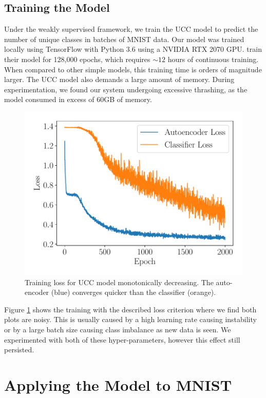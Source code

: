 \documentclass{article} %
\begin{document}
\subsection{Training the Model} %
Under the weakly supervised framework, we train the UCC model to predict the number of unique classes in batches of MNIST data. Our model was trained locally using TensorFlow with Python 3.6 using a NVIDIA RTX 2070 GPU. \cite{Oner2019} train their model for 128,000 epochs, which requires $\sim12$ hours of continuous training. When compared to other simple models, this training time is orders of magnitude larger. The UCC model also demands a large amount of memory. During experimentation, we found our system undergoing excessive thrashing, as the model consumed in excess of 60GB of memory. 

\begin{figure}[htbp]
    \centering
    \includegraphics[scale=0.4]{images/loss_plot.pdf}
    \caption{Training loss for UCC model monotonically decreasing. The auto-encoder (blue) converges quicker than the classifier (orange).}
    \label{fig:ucc_loss}
\end{figure}

Figure \ref{fig:ucc_loss} shows the training with the described loss criterion where we find both plots are noisy. This is usually caused by a high learning rate causing instability or by a large batch size causing class imbalance as new data is seen. We experimented with both of these hyper-parameters, however this effect still persisted.

\section{Applying the Model to MNIST} %
\end{document}
